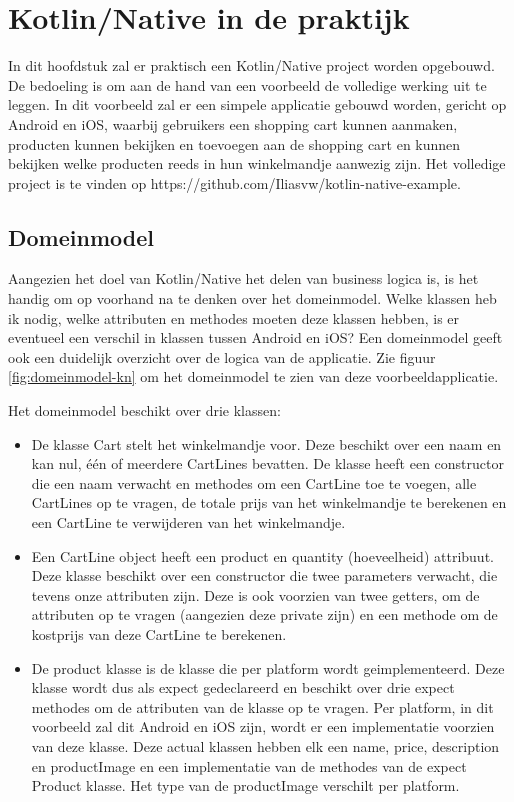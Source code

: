\chapter{Kotlin/Native in de praktijk}
\label{ch:praktisch}
In dit hoofdstuk zal er praktisch een Kotlin/Native project worden opgebouwd. De bedoeling is om aan de hand van een voorbeeld de volledige werking uit te leggen. In dit voorbeeld zal er een simpele applicatie gebouwd worden, gericht op Android en iOS, waarbij gebruikers een shopping cart kunnen aanmaken, producten kunnen bekijken en toevoegen aan de shopping cart en kunnen bekijken welke producten reeds in hun winkelmandje aanwezig zijn. Het volledige project is te vinden op https://github.com/Iliasvw/kotlin-native-example.

\section{Domeinmodel}
\label{sec:domeinmodel}
Aangezien het doel van Kotlin/Native het delen van business logica is, is het handig om op voorhand na te denken over het domeinmodel. Welke klassen heb ik nodig, welke attributen en methodes moeten deze klassen hebben, is er eventueel een verschil in klassen tussen Android en iOS? Een domeinmodel geeft ook een duidelijk overzicht over de logica van de applicatie. Zie figuur \ref{fig:domeinmodel-kn} om het domeinmodel te zien van deze voorbeeldapplicatie. 

Het domeinmodel beschikt over drie klassen: 
\begin{itemize}
	\item De klasse Cart stelt het winkelmandje voor. Deze beschikt over een naam en kan nul, één of meerdere CartLines bevatten. De klasse heeft een constructor die een naam verwacht en methodes om een CartLine toe te voegen, alle CartLines op te vragen, de totale prijs van het winkelmandje te berekenen en een CartLine te verwijderen van het winkelmandje.
	
	\item Een CartLine object heeft een product en quantity (hoeveelheid) attribuut. Deze klasse beschikt over een constructor die twee parameters verwacht, die tevens onze attributen zijn. Deze is ook voorzien van twee getters, om de attributen op te vragen (aangezien deze private zijn) en een methode om de kostprijs van deze CartLine te berekenen.
	
	\item De product klasse is de klasse die per platform wordt geimplementeerd. Deze klasse wordt dus als expect gedeclareerd en beschikt over drie expect methodes om de attributen van de klasse op te vragen. Per platform, in dit voorbeeld zal dit Android en iOS zijn, wordt er een implementatie voorzien van deze klasse. Deze actual klassen hebben elk een name, price, description en productImage en een implementatie van de methodes van de expect Product klasse. Het type van de productImage verschilt per platform.
\end{itemize}

